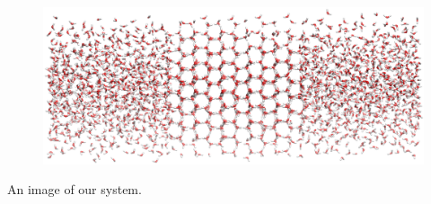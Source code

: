 \documentclass[journal = jpccck, manuscript = article]{achemso}
\begin{document}
\newpage
{}


\begin{tocentry}
\begin{figure}
\begin{center}
\includegraphics[width=\linewidth]{SystemImage.png}
\end{center}
\end{figure}
An image of our system.
\end{tocentry}
\end{document}
